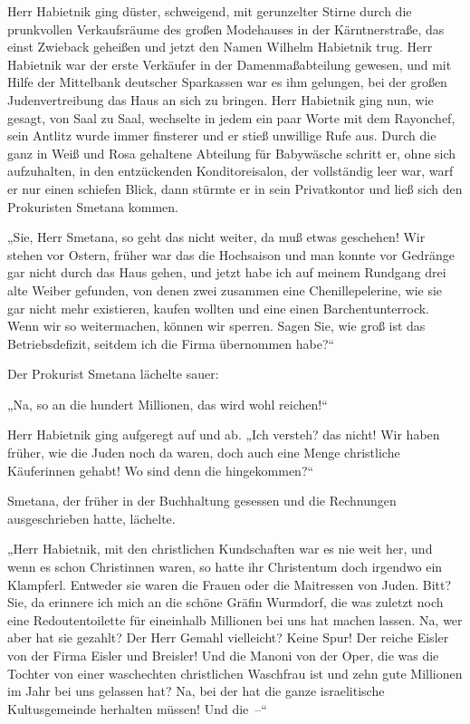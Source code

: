 \tb{* * *}
Herr Habietnik ging düster, schweigend, mit gerunzelter Stirne
durch die prunkvollen Verkaufsräume des großen Modehauses in der
Kärntnerstraße, das einst Zwieback geheißen und jetzt den Namen
Wilhelm Habietnik trug. Herr Habietnik war der erste Verkäufer in
der Damenmaßabteilung gewesen, und mit Hilfe der Mittelbank
deutscher Sparkassen war es ihm gelungen, bei der großen
Judenvertreibung das Haus an sich zu bringen. Herr Habietnik ging
nun, wie gesagt, von Saal zu Saal, wechselte in jedem ein paar
Worte mit dem Rayonchef, sein  Antlitz wurde immer
finsterer und er stieß unwillige Rufe aus. Durch die ganz in Weiß
und Rosa gehaltene Abteilung für Babywäsche schritt er, ohne sich
aufzuhalten, in den entzückenden Konditoreisalon, der vollständig
leer war, warf er nur einen schiefen Blick, dann stürmte er in sein
Privatkontor und ließ sich den Prokuristen Smetana kommen.

„Sie, Herr Smetana, so geht das nicht weiter, da muß etwas
geschehen! Wir stehen vor Ostern, früher war das die Hochsaison und
man konnte vor Gedränge gar nicht durch das Haus gehen, und jetzt
habe ich auf meinem Rundgang drei alte Weiber gefunden, von denen
zwei zusammen eine Chenillepelerine, wie sie gar nicht mehr
existieren, kaufen wollten und eine einen Barchentunterrock. Wenn
wir so weitermachen, können wir sperren. Sagen Sie, wie groß ist
das Betriebsdefizit, seitdem ich die Firma übernommen habe?“

Der Prokurist Smetana lächelte sauer:

„Na, so an die hundert Millionen, das wird wohl reichen!“

Herr Habietnik ging aufgeregt auf und ab. „Ich versteh? das nicht!
Wir haben früher, wie die Juden noch da waren, doch auch eine Menge
christliche Käuferinnen gehabt! Wo sind denn die hingekommen?“

Smetana, der früher in der Buchhaltung gesessen und die Rechnungen
ausgeschrieben hatte, lächelte.

„Herr Habietnik, mit den christlichen Kundschaften war es nie weit
her, und wenn es schon Christinnen waren, so hatte ihr Christentum
doch irgendwo ein Klampferl. Entweder sie waren die Frauen oder die
Maitressen von Juden.  Bitt? Sie, da erinnere ich
mich an die schöne Gräfin Wurmdorf, die was zuletzt noch eine
Redoutentoilette für eineinhalb Millionen bei uns hat machen
lassen. Na, wer aber hat sie gezahlt? Der Herr Gemahl vielleicht?
Keine Spur! Der reiche Eisler von der Firma Eisler und Breisler!
Und die Manoni von der Oper, die was die Tochter von einer
waschechten christlichen Waschfrau ist und zehn gute Millionen im
Jahr bei uns gelassen hat? Na, bei der hat die ganze israelitische
Kultusgemeinde herhalten müssen! Und die~–“

